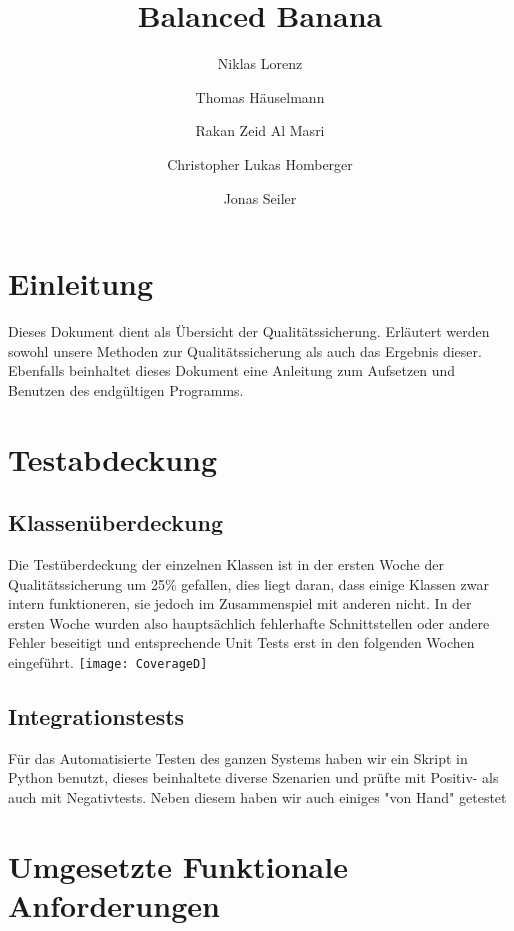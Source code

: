 \documentclass[a4paper,12pt]{article}
\title{Balanced Banana}
\author{Niklas Lorenz \and Thomas Häuselmann \and Rakan Zeid Al Masri \and Christopher Lukas Homberger \and Jonas Seiler}
\begin{document}
\setcounter{page}{2}
\tableofcontents          %
\clearpage
{}

\section{Einleitung}
\vspace{0.2cm}
Dieses Dokument dient als Übersicht der Qualitätssicherung. Erläutert werden sowohl unsere Methoden zur Qualitätssicherung als auch das Ergebnis dieser. Ebenfalls beinhaltet dieses Dokument eine Anleitung zum Aufsetzen und Benutzen des endgültigen Programms.
\section{Testabdeckung}
\subsection{Klassenüberdeckung}
\vspace{0.2cm}
Die Testüberdeckung der einzelnen Klassen ist in der ersten Woche der Qualitätssicherung um 25\% gefallen, dies liegt daran, dass einige Klassen zwar intern funktioneren, sie jedoch im Zusammenspiel mit anderen nicht. In der ersten Woche wurden also hauptsächlich fehlerhafte Schnittstellen oder andere Fehler beseitigt und entsprechende Unit Tests erst in den folgenden Wochen eingeführt. \newline
\texttt{[image: CoverageD]}
\clearpage
\subsection{Integrationstests}
\vspace{0.2cm}
Für das Automatisierte Testen des ganzen Systems haben wir ein Skript in Python benutzt, dieses beinhaltete diverse Szenarien und prüfte mit Positiv- als auch mit Negativtests. Neben diesem haben wir auch einiges "von Hand" getestet
\section{Umgesetzte Funktionale Anforderungen}
\end{document}
